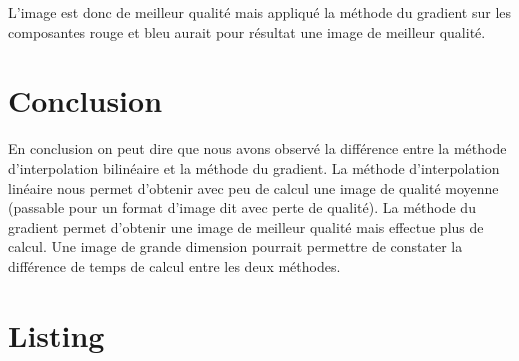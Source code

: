 \documentclass[a4paper,12pt]{report}
\begin{document}
L'image est donc de meilleur qualité mais appliqué la méthode du gradient sur les composantes rouge et bleu aurait pour résultat une image de meilleur qualité.
 	
\section*{Conclusion}

En conclusion on peut dire que nous avons observé la différence entre la méthode d'interpolation bilinéaire et la méthode du gradient. La méthode d'interpolation linéaire nous permet d'obtenir avec peu de calcul une image de qualité moyenne (passable pour un format d'image dit avec perte de qualité). La méthode du gradient permet d'obtenir une image de meilleur qualité mais effectue plus de calcul. Une image de grande dimension pourrait permettre de constater la différence de temps de calcul entre les deux méthodes.

\newpage

\section*{Listing}
\end{document}
